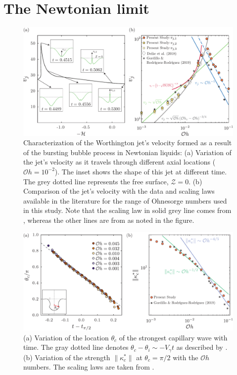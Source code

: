 \documentclass[final]{jfm}
\begin{document}
\section{The Newtonian limit}\label{App::Validation}
\begin{figure}
	\centerline{\includegraphics[width=\linewidth]{Figures/FigureC1-eps-converted-to.pdf}}%
	\caption{Characterization of the Worthington jet's velocity formed as a result of the bursting bubble process in Newtonian liquids: (a) Variation of the jet's velocity as it travels through different axial locations ($\mathcal{O}h = 10^{-2}$). The inset shows the shape of this jet at different time. The grey dotted line represents the free surface, $\mathcal{Z} = 0$. (b) Comparison of the jet's velocity with the data and scaling laws available in the literature for the range of Ohnesorge numbers used in this study. Note that the scaling law in solid grey line comes from \citet{deike2018dynamics}, whereas the other lines are from \citet{gordillo2019capillary} as noted in the figure. }
	\label{fig:NewtonianJetVelocity}
\end{figure}
\begin{figure}
	\centerline{\includegraphics[width=\linewidth]{Figures/FigureC2-eps-converted-to.pdf}}%
	\caption{(a) Variation of the location $\theta_c$ of the strongest capillary wave with time. The gray dotted line denotes $\theta_c - \theta_i \sim -V_\gamma t$ as described by \citet{gordillo2019capillary}. (b) Variation of the strength $\|\kappa_c^*\|$ at $\theta_c = \pi/2$ with the $\mathcal{O}h$ numbers. The scaling laws are taken from \cite{gordillo2019capillary}.}
	\label{fig:CapillaryWavesComparision}
\end{figure}
\end{document}
